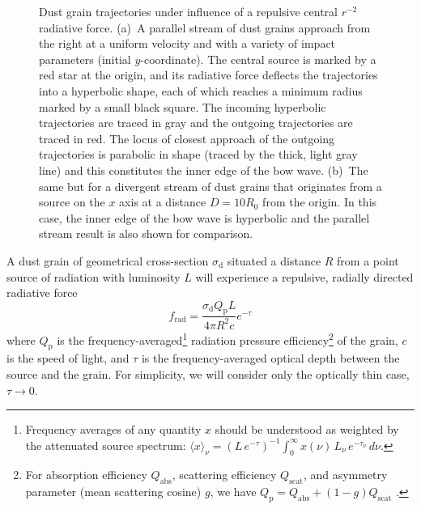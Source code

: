 \begin{figure}
  \caption[Dust grain trajectories]{Dust grain trajectories under
    influence of a repulsive central \(r^{-2}\) radiative force.
    (a)~A parallel stream of dust grains approach from the right at a
    uniform velocity and with a variety of impact parameters (initial
    \(y\)-coordinate). The central source is marked by a red star at
    the origin, and its radiative force deflects the trajectories into
    a hyperbolic shape, each of which reaches a minimum radius marked
    by a small black square.  The incoming hyperbolic trajectories are
    traced in gray and the outgoing trajectories are traced in red.
    The locus of closest approach of the outgoing trajectories is
    parabolic in shape (traced by the thick, light gray line) and this
    constitutes the inner edge of the bow wave.  (b)~The same but for
    a divergent stream of dust grains that originates from a source on
    the \(x\) axis at a distance \(D = 10 R_0\) from the origin.  In
    this case, the inner edge of the bow wave is hyperbolic and the
    parallel stream result is also shown for comparison.}
  \label{fig:dust-trajectories}
\end{figure}



\newcommand\Qp{\ensuremath{Q_{\text{p}}}}
\newcommand{\grain}{\ensuremath{_{\text{d}}}}
\newcommand{\xsec}{\ensuremath{\sigma\grain}}
\newcommand\frad{\ensuremath{f_{\text{rad}}}}
\newcommand\thm{\ensuremath{\theta_{\text{m}}}}
A dust grain of geometrical cross-section \(\xsec\) situated a
distance \(R\) from a point source of radiation with luminosity \(L\)
will experience a repulsive, radially directed radiative force
\citep[e.g.,][]{Spitzer:1978a}
\begin{equation}
  \label{eq:dust-rad-force}
  \frad = \frac{\xsec \Qp L} {4 \pi R^2 c} e^{-\tau}
\end{equation}
where \Qp{} is the frequency-averaged\footnote{%
  Frequency averages of any quantity \(x\) should be understood as
  weighted by the attenuated source spectrum:
  \(\langle x \rangle_\nu = (L \, e^{-\tau})^{-1} \int_0^\infty x(\nu)\, L_\nu \, e^{-\tau_\nu} \, d\nu
  \).  } %
radiation pressure efficiency\footnote{%
  For absorption efficiency \(Q_{\text{abs}}\), scattering efficiency
  \(Q_{\text{scat}}\), and asymmetry parameter (mean scattering
  cosine) \(g\), we have
  \(\Qp = Q_{\text{abs}} + (1 - g) Q_{\text{scat}}\)
  \citep[e.g., \S~4.5 of][]{Bohren:1983a}.} %
of the grain, \(c\) is the speed of light, and \(\tau\) is the
frequency-averaged optical depth between the source and the grain.
For simplicity, we will consider only the optically thin case,
\(\tau \to 0\).

